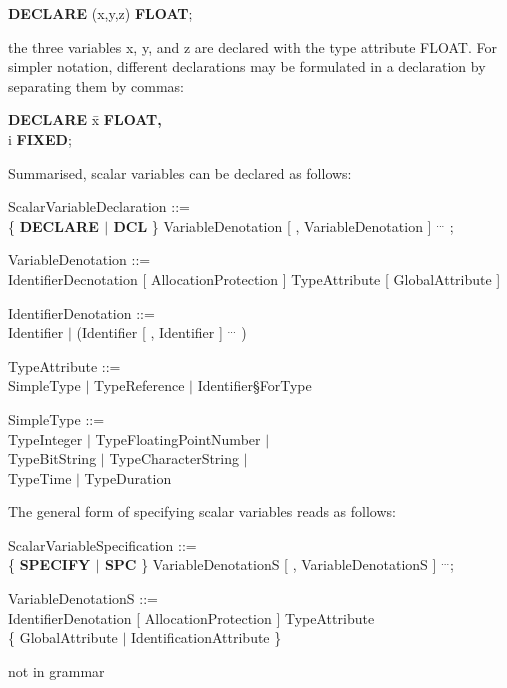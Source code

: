 {\bf DECLARE} (x,y,z) {\bf FLOAT};

the three variables x, y, and z are declared with the type attribute
FLOAT.  For simpler notation, different declarations may be formulated
in a declaration by separating them by commas:

\begin{tabbing}
{\bf DECLARE} \= x {\bf FLOAT,}\\
              \> i {\bf FIXED};
\end{tabbing}

Summarised, scalar variables can be declared as follows:

\begin{front}
ScalarVariableDeclaration ::=\\
\x \{ {\bf DECLARE $\mid$ DCL} \} VariableDenotation [ , VariableDenotation ] $^{...}$ ;

VariableDenotation ::=\\
\x IdentifierDecnotation [ AllocationProtection ] TypeAttribute [ GlobalAttribute ]\\
\x [ InitialisationAttribute ]

IdentifierDenotation ::=\\
\x Identifier $\mid$ (Identifier [ , Identifier ] $^{...}$ )

TypeAttribute ::=\\
\x SimpleType $\mid$ TypeReference $\mid$ Identifier\S ForType

SimpleType ::=\\
\x TypeInteger $\mid$ TypeFloatingPointNumber $\mid$\\
\x TypeBitString $\mid$ TypeCharacterString $\mid$\\
\x TypeTime $\mid$ TypeDuration
\end{front}
\begin{grammar}

\end{grammar}

The general form of specifying scalar variables reads as follows:

\begin{front}
ScalarVariableSpecification ::=\\
\x \{ {\bf SPECIFY $\mid$ SPC} \} VariableDenotationS [ , VariableDenotationS ] $^{...}$;

VariableDenotationS ::=\\
\x IdentifierDenotation [ AllocationProtection ] TypeAttribute\\
\x \{ GlobalAttribute $\mid$ IdentificationAttribute \}
\end{front}
\begin{grammar}
not in grammar
\end{grammar}

